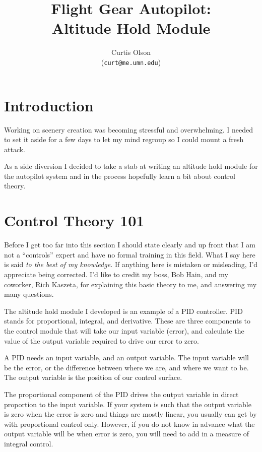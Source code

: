 \documentclass[12pt]{article}
\begin{document}
\title{
  Flight Gear Autopilot: \\
  Altitude Hold Module
}


\author{
  Curtis Olson \\ 
  (\texttt{curt@me.umn.edu})
}


\maketitle

\section{Introduction}

Working on scenery creation was becoming stressful and overwhelming.
I needed to set it aside for a few days to let my mind regroup so I
could mount a fresh attack.

As a side diversion I decided to take a stab at writing an altitude
hold module for the autopilot system and in the process hopefully
learn a bit about control theory.


\section{Control Theory 101}

Before I get too far into this section I should state clearly and up
front that I am not a ``controls'' expert and have no formal training
in this field.  What I say here is said \textit{to the best of my
knowledge.}  If anything here is mistaken or misleading, I'd
appreciate being corrected.  I'd like to credit my boss, Bob Hain, and
my coworker, Rich Kaszeta, for explaining this basic theory to me, and
answering my many questions.

The altitude hold module I developed is an example of a PID
controller.  PID stands for proportional, integral, and derivative.
These are three components to the control module that will take our
input variable (error), and calculate the value of the output variable
required to drive our error to zero.

A PID needs an input variable, and an output variable.  The input
variable will be the error, or the difference between where we are,
and where we want to be.  The output variable is the position of our
control surface.

The proportional component of the PID drives the output variable in
direct proportion to the input variable.  If your system is such that
the output variable is zero when the error is zero and things are
mostly linear, you usually can get by with proportional control only.
However, if you do not know in advance what the output variable will
be when error is zero, you will need to add in a measure of integral
control.
\end{document}
